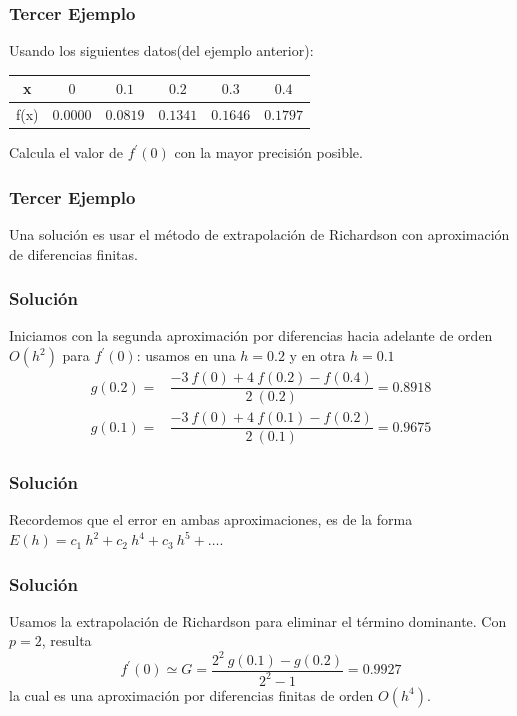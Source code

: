 \begin{frame}
\frametitle{Tercer Ejemplo}
Usando los siguientes datos(del ejemplo anterior):
\begin{center}
\begin{tabular}{c | c | c | c | c | c }
x & $0$ & $0.1$ & $0.2$ & $0.3$ & $0.4$ \\ \hline
f(x) & $0.0000$ & $0.0819$ & $0.1341$ & $0.1646$ & $0.1797$
\end{tabular}
\end{center}
Calcula el valor de  $f^{\prime}(0)$ con la mayor precisión posible.
\end{frame}
\begin{frame}
\frametitle{Tercer Ejemplo}
Una solución es usar el método de extrapolación de Richardson con aproximación de diferencias finitas.
\end{frame}
\begin{frame}
\frametitle{Solución}
Iniciamos con la segunda aproximación por diferencias hacia adelante de orden $O(h^{2})$ para $f^{\prime}(0)$: usamos en una $h = 0.2$ y en otra $h = 0.1$
\[ \begin{split}
g(0.2) =& \dfrac{-3 \: f(0) + 4 \: f(0.2) - f(0.4)}{2 \: (0.2)} = 0.8918 \\
g(0.1) =& \dfrac{-3 \: f(0) + 4 \: f(0.1) - f(0.2)}{2 \: (0.1)} = 0.9675
\end{split} \]
\end{frame}
\begin{frame}
\frametitle{Solución}
Recordemos que el error en ambas aproximaciones, es de la forma $E(h) = c_{1} \: h^{2} + c_{2} \: h^{4} + c_{3} \: h^{5} + \ldots$. 
\end{frame}
\begin{frame}
\frametitle{Solución}
Usamos la extrapolación de Richardson para eliminar el término dominante. Con $p = 2$, resulta
\[ f^{\prime}(0) \simeq G = \dfrac{2^{2} \: g(0.1) - g(0.2)}{2^{2} - 1} = 0.9927 \]
la cual es una aproximación por diferencias finitas de orden $O(h^{4})$.
\end{frame}

